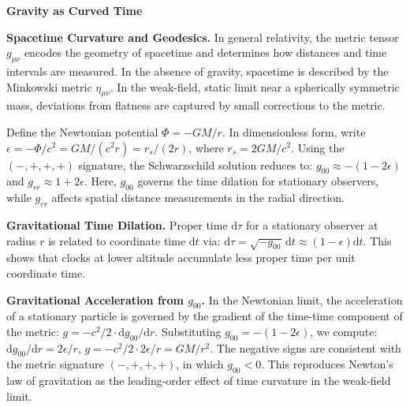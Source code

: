 \begin{technical}

    {\Large\textbf{Gravity as Curved Time}}
    
    \textbf{Spacetime Curvature and Geodesics.}  
    In general relativity, the metric tensor \( g_{\mu\nu} \) encodes the geometry of spacetime and determines how distances and time intervals are measured. In the absence of gravity, spacetime is described by the Minkowski metric \( \eta_{\mu\nu} \). In the weak-field, static limit near a spherically symmetric mass, deviations from flatness are captured by small corrections to the metric. 
    
    Define the Newtonian potential \( \Phi = -GM/r \). In dimensionless form, write \( \epsilon = -\Phi/c^2 = GM/(c^2 r) = r_s/(2r) \), where \( r_s = 2GM/c^2 \). 
    Using the \( (-,+,+,+) \) signature, the Schwarzschild solution reduces to: \( g_{00} \approx -(1 - 2\epsilon) \) and \( g_{rr} \approx 1 + 2\epsilon \).
    Here, \( g_{00} \) governs the time dilation for stationary observers, while \( g_{rr} \) affects spatial distance measurements in the radial direction.
    
    \textbf{Gravitational Time Dilation.}  
    Proper time \( \mathrm{d}\tau \) for a stationary observer at radius \( r \) is related to coordinate time \( \mathrm{d}t \) via: \( \mathrm{d}\tau = \sqrt{-g_{00}}\, \mathrm{d}t \approx (1 - \epsilon) \mathrm{d}t \).
    This shows that clocks at lower altitude accumulate less proper time per unit coordinate time.
    
    \textbf{Gravitational Acceleration from \( g_{00} \).}  
    In the Newtonian limit, the acceleration of a stationary particle is governed by the gradient of the time-time component of the metric: \( g = -c^2/2 \cdot \mathrm{d} g_{00}/\mathrm{d} r \).
    Substituting \( g_{00} = -(1 - 2\epsilon) \), we compute: \( \mathrm{d} g_{00}/\mathrm{d} r = 2\epsilon/r \), \( g = -c^2/2 \cdot 2\epsilon/r = GM/r^2 \).
    The negative signs are consistent with the metric signature \( (-,+,+,+) \), in which \( g_{00} < 0 \). This reproduces Newton’s law of gravitation as the leading-order effect of time curvature in the weak-field limit.
    

\end{technical}
